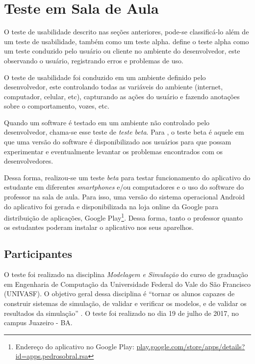 \section{Teste em Sala de Aula}

O teste de usabilidade descrito nas seções anteriores, pode-se classificá-lo além de um teste de usabilidade,
também como um teste alpha.  define o teste alpha como um teste
conduzido pelo usuário ou cliente no ambiente do desenvolvedor, este observando
o usuário, registrando erros e problemas de uso.

O teste de usabilidade foi conduzido em um ambiente definido pelo desenvolvedor, este controlando
todas as variáveis do ambiente (internet, computador, celular, etc), capturando as ações do usuário e
fazendo anotações sobre o comportamento, vozes, etc.

Quando um software é testado em um ambiente não controlado pelo desenvolvedor,
chama-se esse teste de \textit{teste beta}. Para , o teste beta é aquele em
que uma versão do software é disponibilizado aos usuários para que possam experimentar e
eventualmente levantar os problemas encontrados com os desenvolvedores.


Dessa forma, realizou-se um teste \textit{beta} para testar funcionamento do aplicativo do estudante em diferentes
\textit{smartphones} e/ou computadores e o uso do software do professor na sala de aula.
Para isso, uma versão do sistema operacional Android do aplicativo foi gerada e disponibilizada na
loja online da Google para distribuição de aplicações, Google Play\footnote{Endereço do aplicativo no Google Play: \href{https://play.google.com/store/apps/details?id=apps.pedrosobral.rsa}{play.google.com/store/apps/details?id=apps.pedrosobral.rsa}}.
Dessa forma, tanto o professor quanto os estudantes poderam instalar o aplicativo nos seus aparelhos.

\subsection{Participantes}

O teste foi realizado na disciplina \textit{Modelagem e Simulação} do curso de graduação
em Engenharia de Computação da Universidade Federal do Vale do São Francisco (UNIVASF).
O objetivo geral dessa disciplina é ``tornar os alunos capazes de construir sistemas de
simulação, de validar e verificar os modelos, e de validar os resultados da simulação'' \cite{ppcComputacao}.
O teste foi realizado no dia 19 de julho de 2017, no campus Juazeiro - BA.

